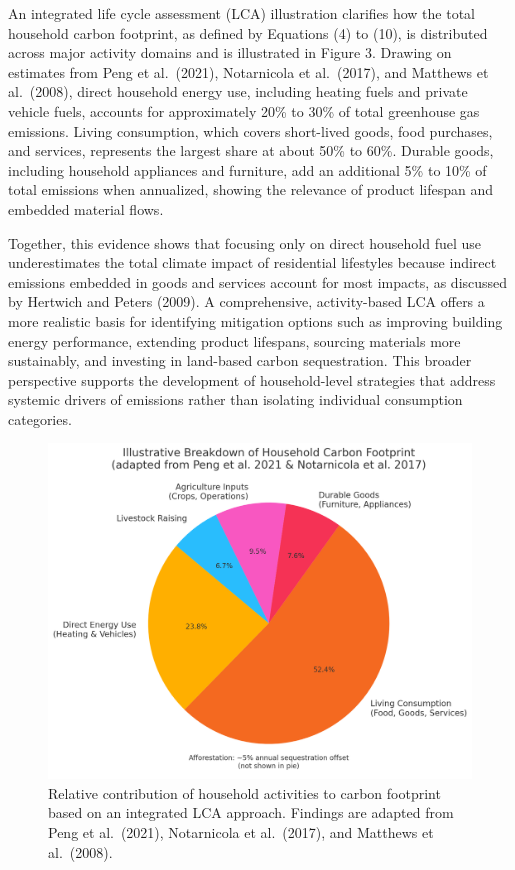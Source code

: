 \documentclass[12pt,a4paper]{article}%
\begin{document}
An integrated life cycle assessment (LCA) illustration clarifies how the total household carbon footprint, as defined by Equations (4) to (10), is distributed across major activity domains and is illustrated in Figure 3. Drawing on estimates from Peng et al.\ (2021), Notarnicola et al.\ (2017), and Matthews et al.\ (2008), direct household energy use, including heating fuels and private vehicle fuels, accounts for approximately 20\% to 30\% of total greenhouse gas emissions. Living consumption, which covers short-lived goods, food purchases, and services, represents the largest share at about 50\% to 60\%. Durable goods, including household appliances and furniture, add an additional 5\% to 10\% of total emissions when annualized, showing the relevance of product lifespan and embedded material flows. 

Together, this evidence shows that focusing only on direct household fuel use underestimates the total climate impact of residential lifestyles because indirect emissions embedded in goods and services account for most impacts, as discussed by Hertwich and Peters (2009). A comprehensive, activity-based LCA offers a more realistic basis for identifying mitigation options such as improving building energy performance, extending product lifespans, sourcing materials more sustainably, and investing in land-based carbon sequestration. This broader perspective supports the development of household-level strategies that address systemic drivers of emissions rather than isolating individual consumption categories.


\begin{figure}[h]
\centering
\includegraphics[width=0.8\linewidth]{LCA_pie.png}
\small \caption{Relative contribution of household activities to carbon footprint based on an integrated LCA approach. Findings are adapted from Peng et al.\ (2021), Notarnicola et al.\ (2017), and Matthews et al.\ (2008).}
\end{figure}
\end{document}
